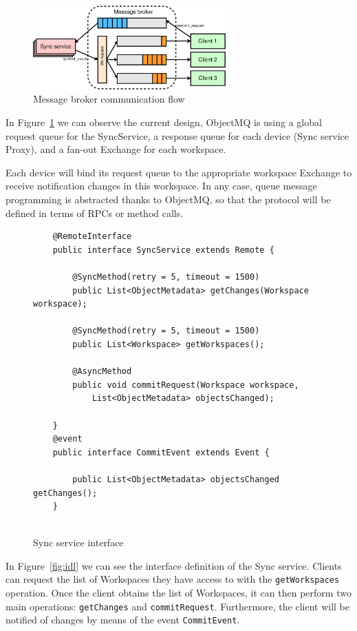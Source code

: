 \begin{figure}[t]
\centering
\includegraphics[width=0.66\textwidth]{figures/message_broker}
\caption{Message broker communication flow}\label{fig:message_broker}
\end{figure}


In Figure~\ref{fig:message_broker} we can observe the current design, ObjectMQ is using a global request queue for the SyncService, 
a response queue for each device (Sync service Proxy), and a fan-out Exchange for each workspace.  

Each device will bind its request queue to the appropriate workspace Exchange to receive notification changes in this workspace.  In any case, queue message programming is abstracted thanks to ObjectMQ, so that the protocol will be defined in terms of RPCs or method calls.


\bigskip
\begin{figure}[h!]
	\begin{lstlisting}
	@RemoteInterface
	public interface SyncService extends Remote {

    	@SyncMethod(retry = 5, timeout = 1500)
    	public List<ObjectMetadata> getChanges(Workspace workspace);

    	@SyncMethod(retry = 5, timeout = 1500)
    	public List<Workspace> getWorkspaces();

    	@AsyncMethod
    	public void commitRequest(Workspace workspace, 
    		List<ObjectMetadata> objectsChanged);

	}
	@event
	public interface CommitEvent extends Event {
		
		public List<ObjectMetadata> objectsChanged getChanges();
	}
	
		\end{lstlisting}
		\caption{Sync service interface}
		\label{fig:idl}
\label{Code:push}
\vspace{-10pt}
\end{figure}


In Figure~\ref{fig:idl} we can see the interface definition of the Sync service. Clients can request the list of Workspaces they have access to with the \texttt{getWorkspaces} operation. Once the client obtains the list of Workspaces, it can then perform two main operations: \texttt{getChanges} and  \texttt{commitRequest}. Furthermore, the client will be notified of changes  by means of the event \texttt{CommitEvent}.

